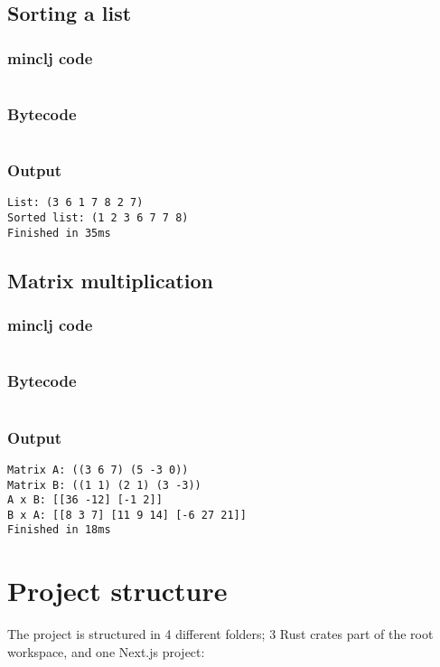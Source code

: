 \documentclass[11pt]{scrreprt}
\begin{document}
\section{Sorting a list}
\subsection{minclj code}
\inputminted{clojure}{/home/mario/git/MarioJim/miniclj/examples/sort_list.clj}

\subsection{Bytecode}
\inputminted{text}{/home/mario/git/MarioJim/miniclj/examples/sort_list.mclj}

\subsection{Output}
\begin{verbatim}
List: (3 6 1 7 8 2 7)
Sorted list: (1 2 3 6 7 7 8)
Finished in 35ms
\end{verbatim}

\section{Matrix multiplication}
\subsection{minclj code}
\inputminted{clojure}{/home/mario/git/MarioJim/miniclj/examples/matrix_multiplication.clj}

\subsection{Bytecode}
\inputminted{text}{/home/mario/git/MarioJim/miniclj/examples/matrix_multiplication.mclj}

\subsection{Output}
\begin{verbatim}
Matrix A: ((3 6 7) (5 -3 0))
Matrix B: ((1 1) (2 1) (3 -3))
A x B: [[36 -12] [-1 2]]
B x A: [[8 3 7] [11 9 14] [-6 27 21]]
Finished in 18ms
\end{verbatim}

\chapter{Project structure}
The project is structured in 4 different folders; 3 Rust crates part of the root workspace, and one Next.js project:
\end{document}
